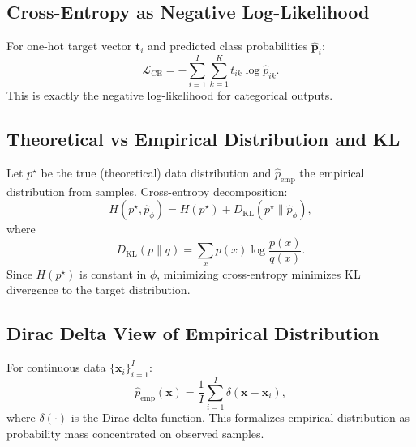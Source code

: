\subsection{Cross-Entropy as Negative Log-Likelihood}
For one-hot target vector $\mathbf{t}_i$ and predicted class probabilities
$\hat{\mathbf{p}}_i$:
\[
\mathcal{L}_{\mathrm{CE}}
=
-\sum_{i=1}^{I}\sum_{k=1}^{K} t_{ik}\log \hat{p}_{ik}.
\]
This is exactly the negative log-likelihood for categorical outputs.

\subsection{Theoretical vs Empirical Distribution and KL}
Let $p^\star$ be the true (theoretical) data distribution and $\hat{p}_{\text{emp}}$
the empirical distribution from samples.
Cross-entropy decomposition:
\[
H(p^\star,\hat{p}_\phi)
=
H(p^\star)+D_{\mathrm{KL}}(p^\star\parallel \hat{p}_\phi),
\]
where
\[
D_{\mathrm{KL}}(p\parallel q)=\sum_x p(x)\log\frac{p(x)}{q(x)}.
\]
Since $H(p^\star)$ is constant in $\phi$, minimizing cross-entropy minimizes
KL divergence to the target distribution.

\subsection{Dirac Delta View of Empirical Distribution}
For continuous data $\{\mathbf{x}_i\}_{i=1}^{I}$:
\[
\hat{p}_{\text{emp}}(\mathbf{x})
=
\frac{1}{I}\sum_{i=1}^{I}\delta(\mathbf{x}-\mathbf{x}_i),
\]
where $\delta(\cdot)$ is the Dirac delta function.
This formalizes empirical distribution as probability mass concentrated on observed
samples.
